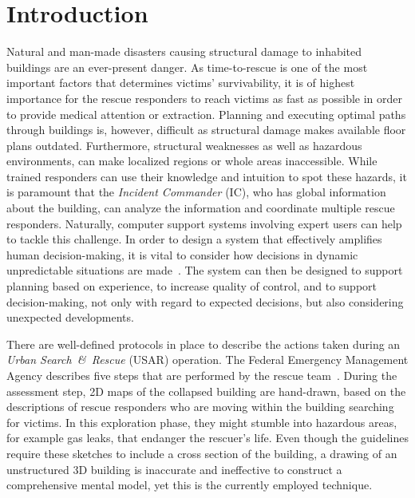 \documentclass[conference,10pt,letter]{IEEEtran}
\begin{document}
%
\IEEEpeerreviewmaketitle

\section{Introduction}

Natural and man-made disasters causing structural damage to inhabited buildings are an ever-present danger. As time-to-rescue is one of the most important factors that determines victims' survivability, it is of highest importance for the rescue responders to reach victims as fast as possible in order to provide medical attention or extraction. Planning and executing optimal paths through buildings is, however, difficult as structural damage makes available floor plans outdated. Furthermore, structural weaknesses as well as hazardous environments, can make localized regions or whole areas inaccessible. While trained responders can use their knowledge and intuition to spot these hazards, it is paramount that the \emph{Incident Commander} (IC), who has global information about the building, can analyze the information and coordinate multiple rescue responders. Naturally, computer support systems involving expert users can help to tackle this challenge. In order to design a system that effectively amplifies human decision-making, it is vital to consider how decisions in dynamic unpredictable situations are made~\cite{Lundberg2012}. The system can then be designed to support planning based on experience, to increase quality of control, and to support decision-making, not only with regard to expected decisions, but also considering unexpected developments.

There are well-defined protocols in place to describe the actions taken during an \emph{Urban Search~\&~Rescue} (USAR) operation. The Federal Emergency Management Agency describes five steps that are performed by the rescue team~\cite{fema08}. During the assessment step, 2D maps of the collapsed building are hand-drawn, based on the descriptions of rescue responders who are moving within the building searching for victims. In this exploration phase, they might stumble into hazardous areas, for example gas leaks, that endanger the rescuer's life. Even though the guidelines require these sketches to include a cross section of the building, a drawing of an unstructured 3D building is inaccurate and ineffective to construct a comprehensive mental model, yet this is the currently employed technique.
\end{document}
